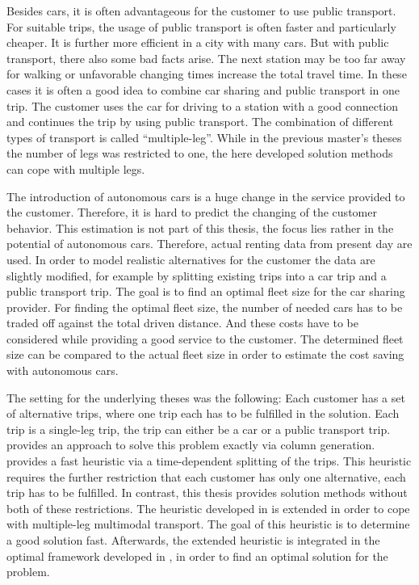 Besides cars, it is often advantageous for the customer to use public transport. For suitable trips, the usage of public transport is often faster and particularly cheaper. It is further more efficient in a city with many cars. But with public transport, there also some bad facts arise. The next station may be too far away for walking or unfavorable changing times increase the total travel time. In these cases it is often a good idea to combine car sharing and public transport in one trip. The customer uses the car for driving to a station with a good connection and continues the trip by using public transport. The combination of different types of transport is called \enquote{multiple-leg}. While in the previous master's theses the number of legs was restricted to one, the here developed solution methods can cope with multiple legs.

The introduction of autonomous cars is a huge change in the service provided to the customer. Therefore, it is hard to predict the changing of the customer behavior. This estimation is not part of this thesis, the focus lies rather in the potential of autonomous cars. Therefore, actual renting data from present day are used. In order to model realistic alternatives for the customer the data are slightly modified, for example by splitting existing trips into a car trip and a public transport trip. The goal is to find an optimal fleet size for the car sharing provider. For finding the optimal fleet size, the number of needed cars has to be traded off against the total driven distance. And these costs have to be considered while providing a good service to the customer. The determined fleet size can be compared to the actual fleet size in order to estimate the cost saving with autonomous cars.

The setting for the underlying theses was the following: Each customer has a set of alternative trips, where one trip each has to be fulfilled in the solution. Each trip is a single-leg trip, \ie the trip can either be a car or a public transport trip. \cite{Kaiser} provides an approach to solve this problem exactly via column generation. \cite{Knoll} provides a fast heuristic via a time-dependent splitting of the trips. This heuristic requires the further restriction that each customer has only one alternative, \ie each trip has to be fulfilled. In contrast, this thesis provides solution methods without both of these restrictions. The heuristic developed in \cite{Knoll} is extended in order to cope with multiple-leg multimodal transport. The goal of this heuristic is to determine a good solution fast. Afterwards, the extended heuristic is integrated in the optimal framework developed in \cite{Kaiser}, in order to find an optimal solution for the problem.